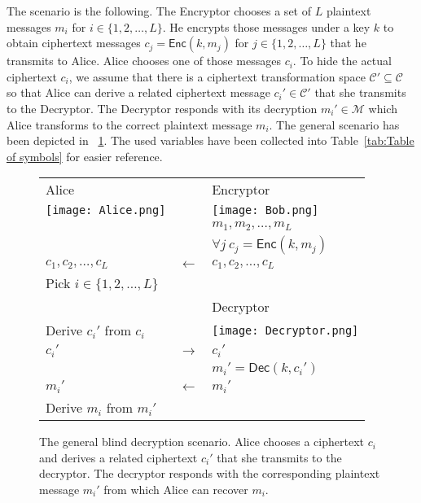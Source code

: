 \documentclass[10pt,journal]{IEEEtran}
\newcommand{\alg}[1]{\mathsf{#1}}
\begin{document}
The scenario is the following.
The Encryptor chooses a set of $L$ plaintext messages $m_i$ for $i \in \{1,2,\ldots,L\}$.
He encrypts those messages under a key $k$ to obtain ciphertext
messages $c_j = \alg{Enc}(k,m_j)$ for $j \in \{1,2,\ldots,L\}$ that he transmits to Alice.
Alice chooses one of those messages $c_i$.
To hide the actual ciphertext $c_i$, we assume that there is a
ciphertext transformation space $\mathcal{C}' \subseteq \mathcal{C}$ so that
Alice can derive a related ciphertext message $c_i' \in \mathcal{C}'$
that she transmits to the Decryptor. The Decryptor responds
with its decryption $m_i' \in \mathcal{M}$
which Alice transforms to the correct plaintext message $m_i$.
The general scenario has been depicted in \figurename~\ref{fig:general_scenario}.
The used variables have been collected into Table~\ref{tab:Table of symbols} for easier reference.
\begin{figure}[!t]
\centering
\begin{tabular}{lcl}
Alice & & Encryptor \\
\texttt{[image: Alice.png]} & & \texttt{[image: Bob.png]}\\
& & $m_1,m_2,\ldots,m_L$ \\
& & $\forall j ~ c_j = \alg{Enc}(k,m_j)$ \\
$c_1,c_2,\ldots,c_L$ & $\longleftarrow$ & $c_1,c_2,\ldots,c_L$ \\
Pick $i \in \{1,2,\ldots,L\}$ & & \\
& & Decryptor\\
Derive $c_i'$ from $c_i$ & & \texttt{[image: Decryptor.png]}\\
$c_i'$ & $\longrightarrow$ & $c_i'$ \\
& & $m_i' = \alg{Dec}(k,c_i')$ \\
$m_i'$ & $\longleftarrow$ & $m_i'$ \\
Derive $m_i$ from $m_i'$ & & \\
\end{tabular}
\caption{The general blind decryption scenario. Alice chooses a ciphertext $c_i$ and derives a related ciphertext $c_i'$ that she transmits to the decryptor. The decryptor responds with the corresponding plaintext message $m_i'$ from which Alice can recover $m_i$.}
\label{fig:general_scenario}
\end{figure}
\end{document}
